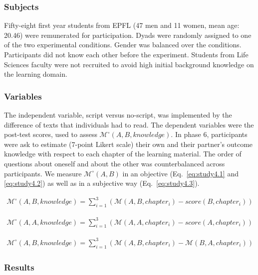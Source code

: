 \documentclass[natbib]{svjour3}
\newcommand{\M}[3]{{\mathcal{M}(#1, #2, #3)}}
\newcommand{\Model}[3]{{$\mathcal{M}^{\circ}(#1, #2, #3)$}}
\newcommand{\gModel}[2]{{$\mathcal{M}^{\circ}(#1, #2)$}}
\newcommand{\Mdeg}[3]{{\mathcal{M}^{\circ}(#1, #2, #3)}}
\begin{document}
\subsubsection*{Subjects}

Fifty-eight first year students from EPFL (47 men and 11 women, mean age: 20.46)
were remunerated for participation. Dyads were randomly assigned to one of the
two experimental conditions. Gender was balanced over the conditions.
Participants did not know each other before the experiment. Students from Life
Sciences faculty were not recruited to avoid high initial background knowledge on the
learning domain.

\subsubsection*{Variables}

The independent variable, script versus no-script, was implemented by the
difference of texts that individuals had to read.  The dependent variables were
the post-test scores, used to assess \Model{A}{B}{knowledge}. In phase 6,
participants were ask to estimate (7-point Likert scale) their own and their
partner's outcome knowledge with respect to each chapter of the learning
material. The order of questions about oneself and about the other was
counterbalanced across participants. We measure \gModel{A}{B} in an objective
(Eq.~\ref{eq:study4.1} and \ref{eq:study4.2}) as well as in a subjective way
(Eq.~\ref{eq:study4.3}).

\begin{multline} \label{eq:study4.1}
    \Mdeg{A}{B}{knowledge} = 
        \sum_{i=1}^{3} (\M{A}{B}{chapter_i} - score(B, chapter_i))
\end{multline}

\begin{multline} \label{eq:study4.2}
    \Mdeg{A}{A}{knowledge} = 
        \sum_{i=1}^{3}  (\M{A}{A}{chapter_i} - score(A, chapter_i))
\end{multline}

\begin{multline} \label{eq:study4.3}
    \Mdeg{A}{B}{knowledge} = 
        \sum_{i=1}^{3}  (\M{A}{B}{chapter_i} - \M{B}{A}{chapter_i})
\end{multline}

\subsubsection*{Results}
\end{document}
